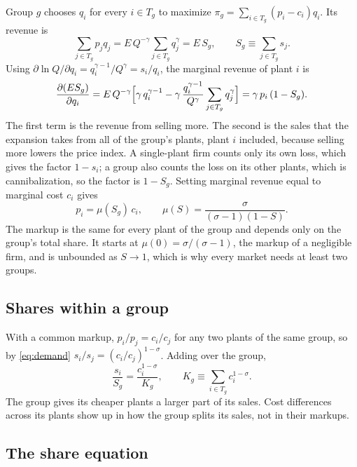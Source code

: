 \documentclass[11pt]{article}
\begin{document}
Group $g$ chooses $q_i$ for every $i\in T_g$ to maximize
$\pi_g=\sum_{i\in T_g}(p_i-c_i)q_i$. Its revenue is
\[
  \sum_{j\in T_g}p_jq_j=E\,Q^{-\gamma}\sum_{j\in T_g}q_j^\gamma=E\,S_g,
  \qquad
  S_g\equiv\sum_{j\in T_g}s_j .
\]
Using $\partial\ln Q/\partial q_i=q_i^{\gamma-1}/Q^\gamma=s_i/q_i$, the marginal revenue of
plant $i$ is
\[
  \frac{\partial(ES_g)}{\partial q_i}
  =E\,Q^{-\gamma}\Bigl[\gamma\,q_i^{\gamma-1}-\gamma\,\frac{q_i^{\gamma-1}}{Q^\gamma}\sum_{j\in T_g}q_j^\gamma\Bigr]
  =\gamma\,p_i\,(1-S_g).
\]
The first term is the revenue from selling more. The second is the sales that the
expansion takes from all of the group's plants, plant $i$ included, because selling
more lowers the price index. A single-plant firm counts only its own loss, which gives
the factor $1-s_i$; a group also counts the loss on its other plants, which is
cannibalization, so the factor is $1-S_g$. Setting marginal revenue equal to marginal
cost $c_i$ gives
\begin{equation}
  p_i=\mu(S_g)\,c_i,
  \qquad
  \mu(S)=\frac{\sigma}{(\sigma-1)(1-S)} .
  \label{eq:markup}
\end{equation}
The markup is the same for every plant of the group and depends only on the group's
total share. It starts at $\mu(0)=\sigma/(\sigma-1)$, the markup of a negligible firm,
and is unbounded as $S\to1$, which is why every market needs at least two groups.

\subsection{Shares within a group}

With a common markup, $p_i/p_j=c_i/c_j$ for any two plants of the same group, so by
\eqref{eq:demand} $s_i/s_j=(c_i/c_j)^{1-\sigma}$. Adding over the group,
\begin{equation}
  \frac{s_i}{S_g}=\frac{c_i^{1-\sigma}}{K_g},
  \qquad
  K_g\equiv\sum_{i\in T_g}c_i^{1-\sigma}.
  \label{eq:withingroup}
\end{equation}
The group gives its cheaper plants a larger part of its sales. Cost differences across
its plants show up in how the group splits its sales, not in their markups.

\subsection{The share equation}
\end{document}
